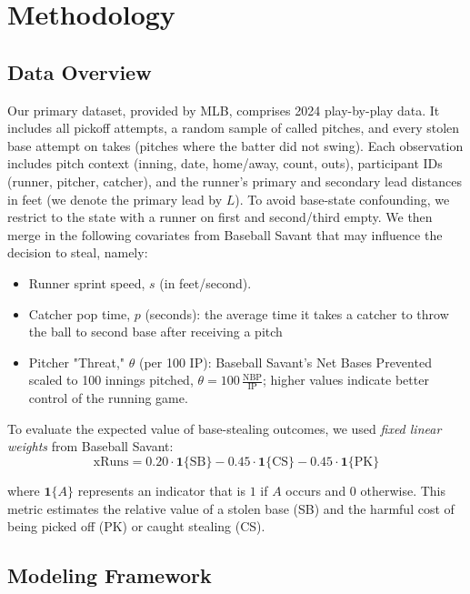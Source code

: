 \documentclass[12pt,letterpaper]{article}
\begin{document}
\section{Methodology}

\subsection{Data Overview}

Our primary dataset, provided by MLB, comprises 2024 play-by-play data. It includes all pickoff attempts, a random sample of called pitches, and every stolen base attempt on takes (pitches where the batter did not swing). Each observation includes pitch context (inning, date, home/away, count, outs), participant IDs (runner, pitcher, catcher), and the runner's primary and secondary lead distances in feet (we denote the primary lead by $L$). To avoid base-state confounding, we restrict to the state with a runner on first and second/third empty. We then merge in the following covariates from Baseball Savant that may influence the decision to steal, namely:
\begin{itemize}
    \item Runner sprint speed, $s$ (in feet/second).
    \item Catcher pop time, $p$ (seconds): the average time it takes a catcher to throw the ball to second base after receiving a pitch
    \item Pitcher "Threat," $\theta$ (per 100 IP): Baseball Savant's Net Bases Prevented \citep{BaseballSavantRunValueND} scaled to 100 innings pitched, $\theta = 100\,\frac{\mathrm{NBP}}{\mathrm{IP}}$; higher values indicate better control of the running game.
\end{itemize}
To evaluate the expected value of base-stealing outcomes, we used \emph{fixed linear weights} from Baseball Savant:
\begin{equation}
    \text{xRuns} = 0.20 \cdot \mathbf{1}\{\text{SB}\} - 0.45 \cdot \mathbf{1}\{\text{CS}\} - 0.45 \cdot \mathbf{1}\{\text{PK}\} \label{eq:xRuns}
\end{equation}

where $\mathbf{1}\{A\}$ represents an indicator that is $1$ if $A$ occurs and $0$ otherwise. This metric estimates the relative value of a stolen base (SB) and the harmful cost of being picked off (PK) or caught stealing (CS).

\subsection{Modeling Framework}
\end{document}
